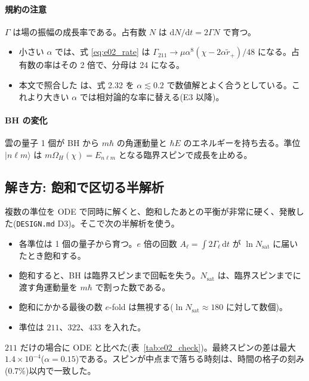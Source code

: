 \paragraph{規約の注意}
$\Gamma$ は場の振幅の成長率である。占有数 $N$ は $\mathrm{d}N/\mathrm{d}t=2\Gamma N$ で育つ。
\begin{itemize}
\item 小さい $\alpha$ では、式 \eqref{eq:e02_rate} は $\Gamma_{211}\to\mu\alpha^8(\chi-2\alpha\tilde r_+)/48$ になる。占有数の率はその 2 倍で、分母は 24 になる。
\item 本文で照合した  は、式 2.32 を $\alpha\lesssim0.2$ で数値解とよく合うとしている。これより大きい $\alpha$ では相対論的な率に替える(E3 以降)。
\end{itemize}

\paragraph{BH の変化}
雲の量子 1 個が BH から $m\hbar$ の角運動量と $\hbar E$ のエネルギーを持ち去る。準位 $|n\ell m\rangle$ は $m\Omega_H(\chi)=E_{n\ell m}$ となる臨界スピンで成長を止める。

\subsection{解き方: 飽和で区切る半解析}

複数の準位を ODE で同時に解くと、飽和したあとの平衡が非常に硬く、発散した(\texttt{DESIGN.md} D3)。そこで次の半解析を使う。
\begin{itemize}
\item 各準位は 1 個の量子から育つ。$e$ 倍の回数 $A_\ell=\int2\Gamma_\ell\,\mathrm{d}t$ が $\ln N_\mathrm{sat}$ に届いたとき飽和する。
\item 飽和すると、BH は臨界スピンまで回転を失う。$N_\mathrm{sat}$ は、臨界スピンまでに渡す角運動量を $m\hbar$ で割った数である。
\item 飽和にかかる最後の数 $e$-fold は無視する($\ln N_\mathrm{sat}\approx180$ に対して数個)。
\item 準位は $211$、$322$、$433$ を入れた。
\end{itemize}
$211$ だけの場合に ODE と比べた(表~\ref{tab:e02_check})。最終スピンの差は最大 $1.4\times10^{-4}$($\alpha=0.15$)である。スピンが中点まで落ちる時刻は、時間の格子の刻み(0.7\%)以内で一致した。

